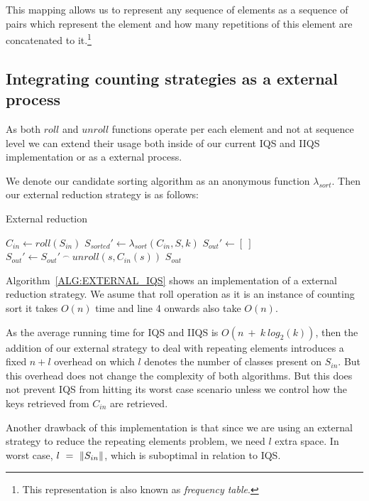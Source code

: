 This mapping allows us to represent any sequence of elements as a sequence of pairs which represent the element and how many repetitions of this element are concatenated to it.\footnote{This representation is also known as \emph{frequency table}.}

\subsection{Integrating counting strategies as a external process}
As both $roll$ and $unroll$ functions operate per each element and not at sequence level we can extend their usage both inside of our current IQS and IIQS implementation or as a external process.

We denote our candidate sorting algorithm as an anonymous function $\lambda_{sort}$. Then our external reduction strategy is as follows:


\begin{algorithm}
\caption{External reduction}\label{ALG:EXTERNAL_IQS}
\begin{algorithmic}[1]
    \State $C_{in} \gets roll(S_{in})$
    \State $S_{sorted}' \gets \lambda_{sort}(C_{in}, S, k)$
    \State $S_{out}' \gets [~]$
        \State $S_{out}' \gets S_{out}'~^\frown~unroll(s, C_{in}(s))$
    \EndFor
    \State \Return $S_{out}$
    \EndProcedure
\end{algorithmic}
\end{algorithm}

Algorithm~\ref{ALG:EXTERNAL_IQS} shows an implementation of a external reduction strategy. We asume that roll operation as it is an instance of counting sort it takes $O(n)$ time and line 4 onwards also take $O(n)$. 

As the average running time for IQS and IIQS is $O(n~+~k~log_2(k))$, then the addition of our external strategy to deal with repeating elements introduces a fixed $n + l$ overhead on which $l$ denotes the number of classes present on $S_{in}$. But this overhead does not change the complexity of both algorithms. But this does not prevent IQS from hitting its worst case scenario unless we control how the keys retrieved from $C_{in}$ are retrieved.

Another drawback of this implementation is that since we are using an external strategy to reduce the repeating elements problem, we need $l$ extra space. In worst case, $l~=~\lVert S_{in}\rVert$, which is suboptimal in relation to IQS.

